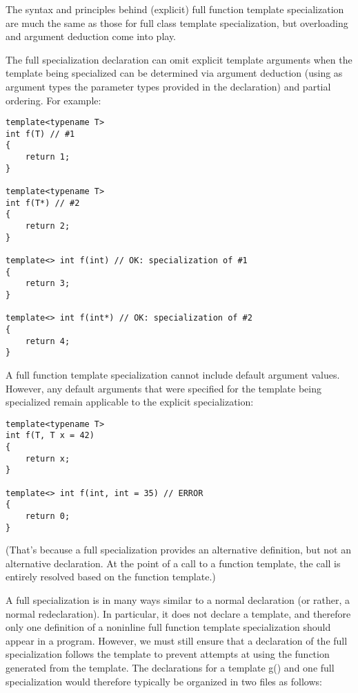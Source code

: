 
The syntax and principles behind (explicit) full function template specialization are much the same as those for full class template specialization, but overloading and argument deduction come into play.

The full specialization declaration can omit explicit template arguments when the template being specialized can be determined via argument deduction (using as argument types the parameter types provided in the declaration) and partial ordering. For example:

\begin{lstlisting}[style=styleCXX]
template<typename T>
int f(T) // #1
{
	return 1;
}

template<typename T>
int f(T*) // #2
{
	return 2;
}

template<> int f(int) // OK: specialization of #1
{
	return 3;
}

template<> int f(int*) // OK: specialization of #2
{
	return 4;
}
\end{lstlisting}

A full function template specialization cannot include default argument values. However, any default arguments that were specified for the template being specialized remain applicable to the explicit specialization:

\begin{lstlisting}[style=styleCXX]
template<typename T>
int f(T, T x = 42)
{
	return x;
}

template<> int f(int, int = 35) // ERROR
{
	return 0;
}
\end{lstlisting}

(That’s because a full specialization provides an alternative definition, but not an alternative declaration. At the point of a call to a function template, the call is entirely resolved based on the function template.)

A full specialization is in many ways similar to a normal declaration (or rather, a normal redeclaration). In particular, it does not declare a template, and therefore only one definition of a noninline full function template specialization should appear in a program. However, we must still ensure that a declaration of the full specialization follows the template to prevent attempts at using the function generated from the template. The declarations for a template g() and one full specialization would therefore typically be organized in two files as follows:

